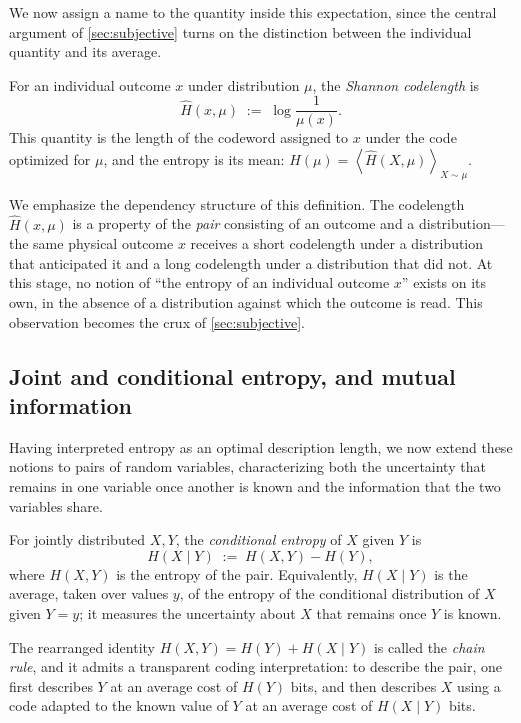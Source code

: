 \documentclass[11pt]{article}
\newcommand{\E}[1]{\left\langle #1 \right\rangle}
\begin{document}
We now assign a name to the quantity inside this expectation, since the central argument of \cref{sec:subjective} turns on the distinction between the individual quantity and its average.

\begin{definition}
\label{def:codelength}
For an individual outcome $x$ under distribution $\mu$, the \emph{Shannon codelength} is
\[
\hat H(x, \mu) \;:=\; \log \frac{1}{\mu(x)} .
\]
This quantity is the length of the codeword assigned to $x$ under the code optimized for $\mu$, and the entropy is its mean: $H(\mu) = \E{\hat H(X,\mu)}_{X \sim \mu}$.
\end{definition}

We emphasize the dependency structure of this definition. The codelength $\hat H(x, \mu)$ is a property of the \emph{pair} consisting of an outcome and a distribution---the same physical outcome $x$ receives a short codelength under a distribution that anticipated it and a long codelength under a distribution that did not. At this stage, no notion of ``the entropy of an individual outcome $x$'' exists on its own, in the absence of a distribution against which the outcome is read. This observation becomes the crux of \cref{sec:subjective}.

\subsection{Joint and conditional entropy, and mutual information}

Having interpreted entropy as an optimal description length, we now extend these notions to pairs of random variables, characterizing both the uncertainty that remains in one variable once another is known and the information that the two variables share.

\begin{definition}
For jointly distributed $X, Y$, the \emph{conditional entropy} of $X$ given $Y$ is
\[
H(X \mid Y) \;:=\; H(X, Y) - H(Y),
\]
where $H(X,Y)$ is the entropy of the pair. Equivalently, $H(X \mid Y)$ is the average, taken over values $y$, of the entropy of the conditional distribution of $X$ given $Y = y$; it measures the uncertainty about $X$ that remains once $Y$ is known.
\end{definition}

The rearranged identity $H(X,Y) = H(Y) + H(X \mid Y)$ is called the \emph{chain rule}, and it admits a transparent coding interpretation: to describe the pair, one first describes $Y$ at an average cost of $H(Y)$ bits, and then describes $X$ using a code adapted to the known value of $Y$ at an average cost of $H(X \mid Y)$ bits.
\end{document}
